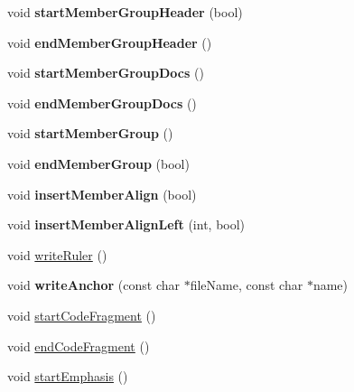 \begin{DoxyCompactItemize}
void {\bfseries start\+Member\+Group\+Header} (bool)
\item 
\mbox{\label{class_latex_generator_ac4339024ccc0da904106eaf6df9514a5}} 
void {\bfseries end\+Member\+Group\+Header} ()
\item 
\mbox{\label{class_latex_generator_a0c1c92164bf40215e01c128cd6d4dc62}} 
void {\bfseries start\+Member\+Group\+Docs} ()
\item 
\mbox{\label{class_latex_generator_a75f69fc27fd975f0203456390c498490}} 
void {\bfseries end\+Member\+Group\+Docs} ()
\item 
\mbox{\label{class_latex_generator_af2b5da0352920bfb5d889ff92b751b70}} 
void {\bfseries start\+Member\+Group} ()
\item 
\mbox{\label{class_latex_generator_a7e4061ce114f8c12c4137582541771af}} 
void {\bfseries end\+Member\+Group} (bool)
\item 
\mbox{\label{class_latex_generator_ab4c418164024ead6645f1c8526887862}} 
void {\bfseries insert\+Member\+Align} (bool)
\item 
\mbox{\label{class_latex_generator_ac5b9cbf30e02b2d1714ffaf648f38e72}} 
void {\bfseries insert\+Member\+Align\+Left} (int, bool)
\item 
void \mbox{\hyperlink{class_latex_generator_a3b87ba9aa190c6337db947023df1c0cc}{write\+Ruler}} ()
\item 
\mbox{\label{class_latex_generator_a158d49cddc6c34aea663fe0726616332}} 
void {\bfseries write\+Anchor} (const char $\ast$file\+Name, const char $\ast$name)
\item 
void \mbox{\hyperlink{class_latex_generator_a4fc23629424d5f2bb82f87d2d0311361}{start\+Code\+Fragment}} ()
\item 
void \mbox{\hyperlink{class_latex_generator_a761292f353178bad45e21ca40cbe6115}{end\+Code\+Fragment}} ()
\item 
void \mbox{\hyperlink{class_latex_generator_a247441f3922c912966d8193f578f5c74}{start\+Emphasis}} ()
\item 

\end{DoxyCompactItemize}
